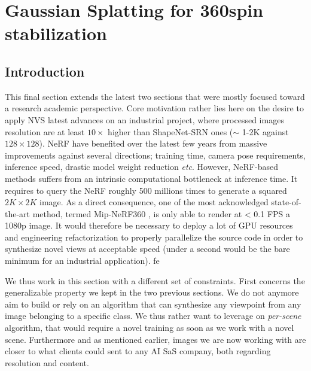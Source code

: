 \chapter{Gaussian Splatting for 360\degree spin stabilization}
\label{chapter:gausssplat}

 


\section{Introduction}
This final section extends the latest two sections that were mostly focused toward a research academic perspective. Core motivation rather lies here on the desire to apply \ac{NVS} latest advances on an industrial project, where processed images resolution are at least $10\times$ higher than ShapeNet-SRN \citep{chang2015shapenet,sitzmann2019scene} ones ($\sim$ 1-2K against $128\times128$). \ac{NeRF} have benefited over the latest few years from massive improvements against several directions; training time, camera pose requirements, inference speed, drastic model weight reduction \textit{etc}. 
However, \ac{NeRF}-based methods suffers from an intrinsic computational bottleneck at inference time. It requires to query the \ac{NeRF} roughly 500 millions times to generate a squared $2K\times2K$ image. As a direct consequence, one of the most acknowledged state-of-the-art method, termed Mip-NeRF360 \citep{barron2022mip}, is only able to render at < 0.1 \ac{FPS} a 1080p image. It would therefore be necessary to deploy a lot of \ac{GPU} resources and engineering refactorization to properly parallelize the source code in order to synthesize novel views at acceptable speed (under a second would be the bare minimum for an industrial application). 
fe

We thus work in this section with a different set of constraints. First concerns the generalizable property we kept in the two previous sections. We do not anymore aim to build or rely on an algorithm that can synthesize any viewpoint from any image belonging to a specific class. We thus rather want to leverage on \textit{per-scene} algorithm, that would require a novel training as soon as we work with a novel scene. Furthermore and as mentioned earlier, images we are now working with are closer to what clients could sent to any \ac{AI} SaS company, both regarding resolution and content. 

